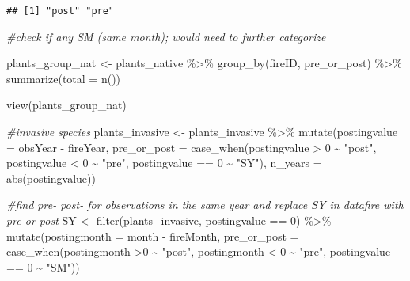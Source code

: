\documentclass[
]{article}
\newenvironment{Shaded}{\begin{snugshade}}{\end{snugshade}}
\newcommand{\AttributeTok}[1]{\textcolor[rgb]{0.77,0.63,0.00}{#1}}
\newcommand{\CommentTok}[1]{\textcolor[rgb]{0.56,0.35,0.01}{\textit{#1}}}
\newcommand{\DecValTok}[1]{\textcolor[rgb]{0.00,0.00,0.81}{#1}}
\newcommand{\FunctionTok}[1]{\textcolor[rgb]{0.00,0.00,0.00}{#1}}
\newcommand{\NormalTok}[1]{#1}
\newcommand{\OtherTok}[1]{\textcolor[rgb]{0.56,0.35,0.01}{#1}}
\newcommand{\SpecialCharTok}[1]{\textcolor[rgb]{0.00,0.00,0.00}{#1}}
\newcommand{\StringTok}[1]{\textcolor[rgb]{0.31,0.60,0.02}{#1}}
\begin{document}
\begin{verbatim}
## [1] "post" "pre"
\end{verbatim}

\begin{Shaded}
\begin{Highlighting}[]
\CommentTok{\#check if any SM (same month); would need to further categorize}

\NormalTok{plants\_group\_nat }\OtherTok{\textless{}{-}}\NormalTok{  plants\_native }\SpecialCharTok{\%\textgreater{}\%} 
  \FunctionTok{group\_by}\NormalTok{(fireID, pre\_or\_post) }\SpecialCharTok{\%\textgreater{}\%} 
  \FunctionTok{summarize}\NormalTok{(}\AttributeTok{total =} \FunctionTok{n}\NormalTok{())}

\FunctionTok{view}\NormalTok{(plants\_group\_nat)}

\CommentTok{\#invasive species }
\NormalTok{plants\_invasive }\OtherTok{\textless{}{-}}\NormalTok{ plants\_invasive }\SpecialCharTok{\%\textgreater{}\%} 
  \FunctionTok{mutate}\NormalTok{(}\AttributeTok{postingvalue =}\NormalTok{ obsYear }\SpecialCharTok{{-}}\NormalTok{ fireYear, }
         \AttributeTok{pre\_or\_post =} \FunctionTok{case\_when}\NormalTok{(postingvalue }\SpecialCharTok{\textgreater{}} \DecValTok{0} \SpecialCharTok{\textasciitilde{}} \StringTok{"post"}\NormalTok{,}
\NormalTok{                                 postingvalue }\SpecialCharTok{\textless{}} \DecValTok{0} \SpecialCharTok{\textasciitilde{}} \StringTok{"pre"}\NormalTok{,}
\NormalTok{                                 postingvalue }\SpecialCharTok{==} \DecValTok{0} \SpecialCharTok{\textasciitilde{}} \StringTok{"SY"}\NormalTok{),}
         \AttributeTok{n\_years =} \FunctionTok{abs}\NormalTok{(postingvalue))}

\CommentTok{\#find pre{-} post{-} for observations in the same year and replace SY in datafire with pre or post}
\NormalTok{SY }\OtherTok{\textless{}{-}} \FunctionTok{filter}\NormalTok{(plants\_invasive, postingvalue }\SpecialCharTok{==} \DecValTok{0}\NormalTok{) }\SpecialCharTok{\%\textgreater{}\%} 
  \FunctionTok{mutate}\NormalTok{(}\AttributeTok{postingmonth =}\NormalTok{ month }\SpecialCharTok{{-}}\NormalTok{ fireMonth,}
    \AttributeTok{pre\_or\_post =} \FunctionTok{case\_when}\NormalTok{(postingmonth }\SpecialCharTok{\textgreater{}}\DecValTok{0} \SpecialCharTok{\textasciitilde{}} \StringTok{"post"}\NormalTok{,}
\NormalTok{                            postingmonth }\SpecialCharTok{\textless{}} \DecValTok{0} \SpecialCharTok{\textasciitilde{}} \StringTok{"pre"}\NormalTok{,}
\NormalTok{                            postingvalue }\SpecialCharTok{==} \DecValTok{0} \SpecialCharTok{\textasciitilde{}} \StringTok{"SM"}\NormalTok{))}


\end{Highlighting}
\end{Shaded}
\end{document}
